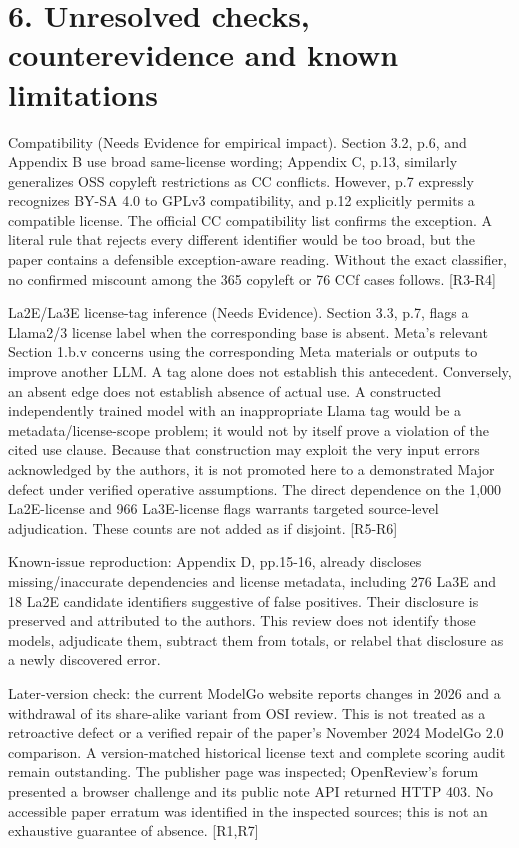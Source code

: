 \documentclass[10pt]{article}
\begin{document}
\section*{6. Unresolved checks, counterevidence and known limitations}
Compatibility (Needs Evidence for empirical impact). Section 3.2, p.6, and Appendix B use broad same-license wording; Appendix C, p.13, similarly generalizes OSS copyleft restrictions as CC conflicts. However, p.7 expressly recognizes BY-SA 4.0 to GPLv3 compatibility, and p.12 explicitly permits a compatible license. The official CC compatibility list confirms the exception. A literal rule that rejects every different identifier would be too broad, but the paper contains a defensible exception-aware reading. Without the exact classifier, no confirmed miscount among the 365 copyleft or 76 CCf cases follows. [R3-R4]\par
La2E/La3E license-tag inference (Needs Evidence). Section 3.3, p.7, flags a Llama2/3 license label when the corresponding base is absent. Meta’s relevant Section 1.b.v concerns using the corresponding Meta materials or outputs to improve another LLM. A tag alone does not establish this antecedent. Conversely, an absent edge does not establish absence of actual use. A constructed independently trained model with an inappropriate Llama tag would be a metadata/license-scope problem; it would not by itself prove a violation of the cited use clause. Because that construction may exploit the very input errors acknowledged by the authors, it is not promoted here to a demonstrated Major defect under verified operative assumptions. The direct dependence on the 1,000 La2E-license and 966 La3E-license flags warrants targeted source-level adjudication. These counts are not added as if disjoint. [R5-R6]\par
Known-issue reproduction: Appendix D, pp.15-16, already discloses missing/inaccurate dependencies and license metadata, including 276 La3E and 18 La2E candidate identifiers suggestive of false positives. Their disclosure is preserved and attributed to the authors. This review does not identify those models, adjudicate them, subtract them from totals, or relabel that disclosure as a newly discovered error.\par
Later-version check: the current ModelGo website reports changes in 2026 and a withdrawal of its share-alike variant from OSI review. This is not treated as a retroactive defect or a verified repair of the paper’s November 2024 ModelGo 2.0 comparison. A version-matched historical license text and complete scoring audit remain outstanding. The publisher page was inspected; OpenReview’s forum presented a browser challenge and its public note API returned HTTP 403. No accessible paper erratum was identified in the inspected sources; this is not an exhaustive guarantee of absence. [R1,R7]\par
\end{document}
